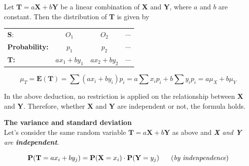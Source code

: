 \documentclass[a4paper, 12pt,twoside]{book}
\begin{document}
Let $\textbf{T} = a\textbf{X} + b\textbf{Y}$ be a linear combination of \textbf{X} and \textbf{Y}, where $a$ and $b$ are constant. Then the distribution of \textbf{T} is given by 
        \begin{table}[H]
        \centering
           \begin{tabular}{lccc}
           \hline
           \textbf{S}:&$O_1$&$O_2$&$\cdots$\vspace{0.2cm}\\
           \textbf{Probability:}&$p_1$&$p_2$&$\cdots$\vspace{0.2cm}\\
           \textbf{T:}&$ax_1+by_1$&$ax_2+by_2$&$\cdots$\\          
           \hline
           \end{tabular}
        \end{table}
$$\mu_T = \textbf{E}(\textbf{T}) = \sum (ax_i+by_i)p_i = a\sum x_ip_i +b\sum y_ip_i = a\mu_X + b\mu_Y$$
\hspace{-0.5cm}
\colorbox{babypink}{\parbox{\textwidth}{
In the above deduction, no restriction is applied on the relationship between \textbf{X} and \textbf{Y}. Therefore, whether \textbf{X} and \textbf{Y} are independent or not, the formula holds.
}}
\newpage

\noindent\textbf{The variance and standard deviation}\vspace{0.3cm}\\
Let's consider the same random variable $\textbf{T} = a\textbf{X} + b\textbf{Y}$ as above and \textit{\textbf{X} and \textbf{Y} are \textbf{independent}}. 

$$\textbf{P}(\textbf{T} = ax_i +by_j) = \textbf{P}(\textbf{X} = x_i)\cdot \textbf{P}(\textbf{Y} = y_j) \hspace{0.6cm} (\textit{by indenpendence})$$
\end{document}
